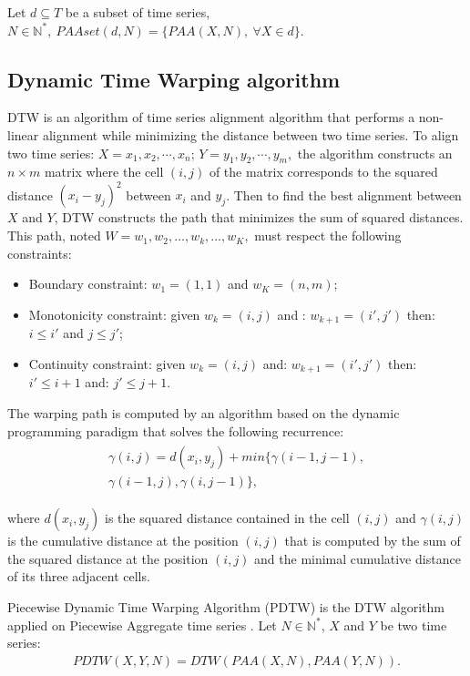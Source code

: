 \begin{definition}
Let $d\subseteq T$ be a subset of time series,
$N\in\mathbb{N}^{*},\:PAAset(d,N)=\{PAA(X,N),\:\forall X\in d\}.$
\end{definition}

\subsection{Dynamic Time Warping algorithm}
DTW \cite{sakoe1978dynamic} is an algorithm of time series alignment
algorithm that  performs a non-linear alignment while
minimizing the distance between two time series. To align two time series: 
$X=x_{1},x_{2},\cdots,x_{n};\,
Y=y_{1},y_{2},\cdots,y_{m},$ the algorithm constructs an  $n\times m$  matrix where the cell $(i,
j)$ of the matrix corresponds to the squared distance $(x_{i}-y_{j})^{2}$ between $x_{i}$
and $y_{j}$. Then to find the best alignment between $X$ and $Y$, DTW constructs the path that minimizes the sum of squared distances. This path, noted
$W = w_1, w_2, \ldots, w_k, \ldots, w_K,$ must respect the following constraints:
\begin{itemize}
  \item Boundary constraint: $w_1 = (1, 1)$ and  $w_K = (n, m)$;
  \item Monotonicity constraint: given $w_k = (i, j)$ and :  $w_{k + 1} =
  (i',j')$ then: $i \leq i'$ and $j \leq j'$;
 \item Continuity constraint: given $w_k = (i, j)$ and:   $w_{k + 1} = (i', j')$
 then: $i' \leq i + 1$ and: $j' \leq j + 1$.
\end{itemize}
The warping path is computed by  an algorithm based on the dynamic
programming paradigm that solves the following recurrence:
\begin{eqnarray}
\begin{array}{l}
\gamma(i,j)=d(x_{i},y_{j}) + min\{\gamma(i-1, j-1), \\
\gamma(i-1, j),\gamma(i, j-1)\},
\end{array}
\end{eqnarray}


where $d(x_{i},y_{j})$ is the squared distance contained in the cell $(i, j)$ and $\gamma(i, j)$ is the cumulative distance at the position $(i, j)$ that is computed by the sum of the squared distance at the position $(i, j)$ and the minimal cumulative distance of its three adjacent cells.


Piecewise Dynamic Time Warping Algorithm (PDTW) \cite{keogh2000scaling} is the DTW algorithm applied on Piecewise Aggregate time series \cite{keogh2001dimensionality}. Let $N\in\mathbb{N^{*}}$, $X$ and $Y$ be two time series:
\begin{eqnarray}
PDTW(X, Y, N) = DTW(PAA(X, N), PAA(Y, N)).
\end{eqnarray}

